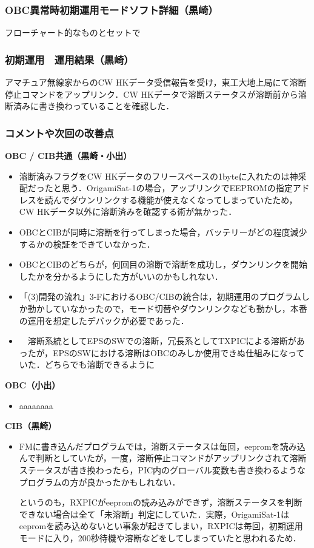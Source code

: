 \subsubsection{OBC異常時初期運用モードソフト詳細（黒崎）}
フローチャート的なものとセットで

\subsubsection{初期運用　運用結果（黒崎）}
アマチュア無線家からのCW HKデータ受信報告を受け，東工大地上局にて溶断停止コマンドをアップリンク．CW HKデータで溶断ステータスが溶断前から溶断済みに書き換わっていることを確認した．

\subsubsection{コメントや次回の改善点}
\hspace{2ex}
\textbf{OBC / CIB共通（黒崎・小出）}
\begin{itemize}
	\item 溶断済みフラグをCW HKデータのフリースペースの1byteに入れたのは神采配だったと思う．OrigamiSat-1の場合，アップリンクでEEPROMの指定アドレスを読んでダウンリンクする機能が使えなくなってしまっていたため，CW HKデータ以外に溶断済みを確認する術が無かった．
	\item OBCとCIBが同時に溶断を行ってしまった場合，バッテリーがどの程度減少するかの検証をできていなかった．
	\item OBCとCIBのどちらが，何回目の溶断で溶断を成功し，ダウンリンクを開始したかを分かるようにした方がいいのかもしれない．
	\item 「(3)開発の流れ」3-FにおけるOBC/CIBの統合は，初期運用のプログラムしか動かしていなかったので，モード切替やダウンリンクなども動かし，本番の運用を想定したデバックが必要であった．
	\item　溶断系統としてEPSのSWでの溶断，冗長系としてTXPICによる溶断があったが，EPSのSWにおける溶断はOBCのみしか使用できぬ仕組みになっていた．どちらでも溶断できるように
\end{itemize}

\hspace{2ex}
\textbf{OBC（小出）}
\begin{itemize}
	\item aaaaaaaa
\end{itemize}

\hspace{2ex}
\textbf{CIB（黒崎）}
\begin{itemize}
	\item FMに書き込んだプログラムでは，溶断ステータスは毎回，eepromを読み込んで判断としていたが，一度，溶断停止コマンドがアップリンクされて溶断ステータスが書き換わったら，PIC内のグローバル変数も書き換わるようなプログラムの方が良かったかもしれない．
	
	というのも，RXPICがeepromの読み込みができず，溶断ステータスを判断できない場合は全て「未溶断」判定にしていた．実際，OrigamiSat-1はeepromを読み込めないとい事象が起きてしまい，RXPICは毎回，初期運用モードに入り，200秒待機や溶断などをしてしまっていたと思われるため．
\end{itemize}